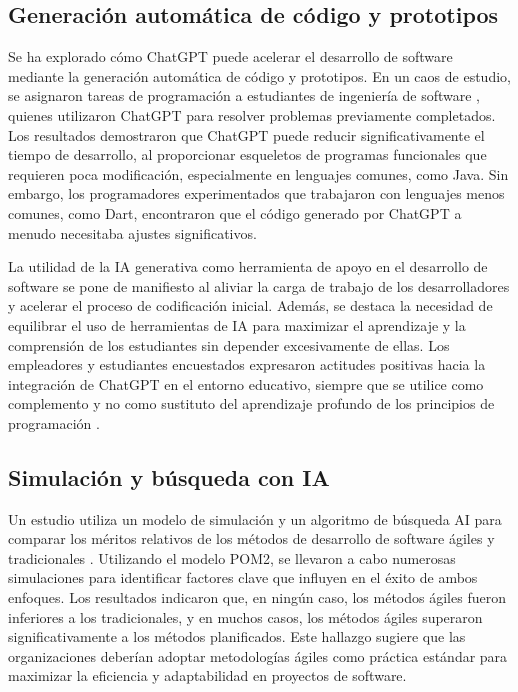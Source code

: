 \subsection{Generación automática de código y prototipos}

Se ha explorado cómo ChatGPT puede acelerar el desarrollo de software mediante la generación automática de código y prototipos. En un caos de estudio, se asignaron tareas de programación a estudiantes de ingeniería de software \cite{Petrovska2023}, quienes utilizaron ChatGPT para resolver problemas previamente completados. Los resultados demostraron que ChatGPT puede reducir significativamente el tiempo de desarrollo, al proporcionar esqueletos de programas funcionales que requieren poca modificación, especialmente en lenguajes comunes, como Java. Sin embargo, los programadores experimentados que trabajaron con lenguajes menos comunes, como Dart, encontraron que el código generado por ChatGPT a menudo necesitaba ajustes significativos.

La utilidad de la IA generativa como herramienta de apoyo en el desarrollo de software se pone de manifiesto al aliviar la carga de trabajo de los desarrolladores y acelerar el proceso de codificación inicial. Además, se destaca la necesidad de equilibrar el uso de herramientas de IA para maximizar el aprendizaje y la comprensión de los estudiantes sin depender excesivamente de ellas. Los empleadores y estudiantes encuestados expresaron actitudes positivas hacia la integración de ChatGPT en el entorno educativo, siempre que se utilice como complemento y no como sustituto del aprendizaje profundo de los principios de programación \cite{Petrovska2023}.

\subsection{Simulación y búsqueda con IA}

Un estudio utiliza un modelo de simulación y un algoritmo de búsqueda AI para comparar los méritos relativos de los métodos de desarrollo de software ágiles y tradicionales \cite{Lemon2009}. Utilizando el modelo POM2, se llevaron a cabo numerosas simulaciones para identificar factores clave que influyen en el éxito de ambos enfoques. Los resultados indicaron que, en ningún caso, los métodos ágiles fueron inferiores a los tradicionales, y en muchos casos, los métodos ágiles superaron significativamente a los métodos planificados. Este hallazgo sugiere que las organizaciones deberían adoptar metodologías ágiles como práctica estándar para maximizar la eficiencia y adaptabilidad en proyectos de software.

